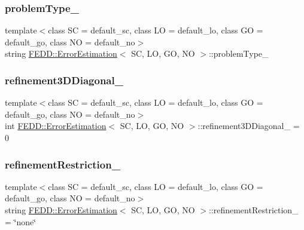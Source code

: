\mbox{\label{classFEDD_1_1ErrorEstimation_abc2a8046fe8375f4a0c0ab0e52bc0ffc}} 
\subsubsection{\texorpdfstring{problem\+Type\+\_\+}{problemType\_}}
{\footnotesize\ttfamily template$<$class SC = default\+\_\+sc, class LO = default\+\_\+lo, class GO = default\+\_\+go, class NO = default\+\_\+no$>$ \\
string \hyperlink{classFEDD_1_1ErrorEstimation}{F\+E\+D\+D\+::\+Error\+Estimation}$<$ SC, LO, GO, NO $>$\+::problem\+Type\+\_\+}

\mbox{\label{classFEDD_1_1ErrorEstimation_a3695b55e1703c3c03077bbc17a44fae9}} 
\subsubsection{\texorpdfstring{refinement3\+D\+Diagonal\+\_\+}{refinement3DDiagonal\_}}
{\footnotesize\ttfamily template$<$class SC = default\+\_\+sc, class LO = default\+\_\+lo, class GO = default\+\_\+go, class NO = default\+\_\+no$>$ \\
int \hyperlink{classFEDD_1_1ErrorEstimation}{F\+E\+D\+D\+::\+Error\+Estimation}$<$ SC, LO, GO, NO $>$\+::refinement3\+D\+Diagonal\+\_\+ = 0}

\mbox{\label{classFEDD_1_1ErrorEstimation_ae187dd8db953862a2395d897e1317117}} 
\subsubsection{\texorpdfstring{refinement\+Restriction\+\_\+}{refinementRestriction\_}}
{\footnotesize\ttfamily template$<$class SC = default\+\_\+sc, class LO = default\+\_\+lo, class GO = default\+\_\+go, class NO = default\+\_\+no$>$ \\
string \hyperlink{classFEDD_1_1ErrorEstimation}{F\+E\+D\+D\+::\+Error\+Estimation}$<$ SC, LO, GO, NO $>$\+::refinement\+Restriction\+\_\+ = \char`\"{}none\char`\"{}}

